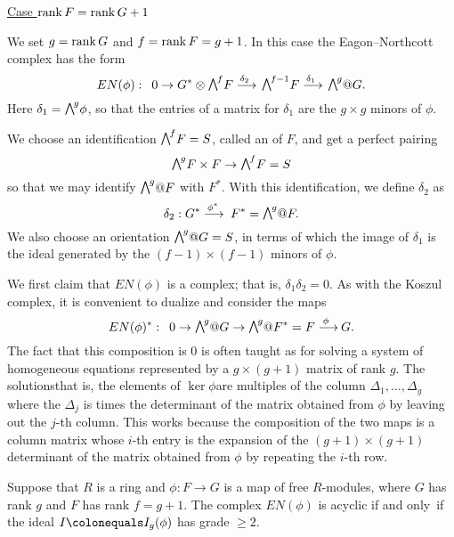 \smallbreak
\noindent
\underline{Case $\operatorname{rank} F=\operatorname{rank} G + 1$}
\smallbreak

We set $g=\operatorname{rank} G$ and $f = \operatorname{rank} F = g+1$. In this case the
Eagon--Northcott complex has the form
$$
EN(\phi):\quad 0\to G^{*}\otimes \mwedge^{f}F \ruto {\delta_{2}}
\mwedge^{f-1}F \ruto {\delta_{1}} \mwedge^g@G.
$$
Here $\delta_{1} = \mwedge^{g}\phi$, so that the entries of a matrix for
$\delta_{1}$ are the $g\times g$ minors of
$\phi$.

We choose an identification $\mwedge^{f}F = S$, called an
%
of $F$, and get a perfect pairing
$$
\mwedge^{g}F \times F \to \mwedge^{f}F = S
$$
so that we may identify
$\mwedge^{g}@F$ with $F^{*}$. With this identification, we define
$\delta_{2}$ as
$$
\delta_{2}:  G^{*}\ruto {\phi^{*}}  F^{*} = \mwedge^{g}@F.
$$
We also choose an orientation $\mwedge^{g}@G = S$, in terms of which the
image of $\delta_{1}$ is
the ideal generated by the $(f{-}1)\times (f{-}1)$  minors of $\phi$.

We first claim that $EN(\phi)$ is a complex; that is,
$\delta_{1}\delta_{2} = 0$.  As with the Koszul complex,
%
it is convenient to dualize and consider the maps
$$
EN(\phi)^{*}:\quad 0\to \mwedge^{g} @
G \to \mwedge^{g}@F^{*} = F\ruto{\,\phi} G
.
$$
The fact that this composition is 0 is often taught as 
%
for solving a system of
homogeneous equations represented by a $g\times (g+1)$ matrix of rank $g$.
The solutions\emdash that is, the elements of $\ker \phi$\emdash are
multiples of the column
$\Delta_{1}, \dots, \Delta_{g}$ where the $\Delta_{j}$ is 
times the determinant
of the matrix obtained from $\phi$ by leaving out the $j$-th column. This
works
because the composition of the two maps is a column matrix whose $i$-th
entry is the
expansion of the $(g+1)\times (g+1)$ determinant of the matrix obtained
from $\phi$ by
repeating the $i$-th row.

\begin{theorem}\label{EN grade 2}
Suppose that $R$ is a ring and $\phi: F\to G$ is a map of  free
$R$-modules,
where $G$ has rank $g$ and $F$ has rank $f = g+1$.
The complex $EN(\phi)$ is acyclic if and only~if the ideal $I
\colonequals  I_{g}(\phi)$ has grade $\geq 2$.
\end{theorem}

